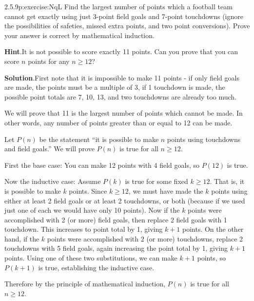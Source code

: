 \documentclass[twoside,11pt,]{book}
\newcommand{\blocktitlefont}{\relax}
\numberwithin{equation}{chapter}
\begin{document}
\begin{divisionsolution}{2.5.9}{}{p:exercise:NqL}%
Find the largest number of points which a football team cannot get exactly using just 3-point field goals and 7-point touchdowns (ignore the possibilities of safeties, missed extra points, and two point conversions). Prove your answer is correct by mathematical induction.%
\par\smallskip%
\noindent\textbf{\blocktitlefont Hint}.\quad{}It is not possible to score exactly 11 points.  Can you prove that you can score \(n\) points for any \(n \ge 12\)?%
\par\smallskip%
\noindent\textbf{\blocktitlefont Solution}.\quad{}First note that it is impossible to make 11 points - if only field goals are made, the points must be a multiple of 3, if 1 touchdown is made, the possible point totals are 7, 10, 13, \textellipsis{} and two touchdowns are already too much.%
\par
We will prove that 11 is the largest number of points which cannot be made. In other words, any number of points greater than or equal to 12 can be made.%
\begin{solutionproof}
Let \(P(n)\) be the statement ``it is possible to make \(n\) points using touchdowns and field goals.'' We will prove \(P(n)\) is true for all \(n \ge 12\).%
\par
First the base case: You can make 12 points with 4 field goals, so \(P(12)\) is true.%
\par
Now the inductive case: Assume \(P(k)\) is true for some fixed \(k \ge 12\). That is, it is possible to make \(k\) points. Since \(k \ge 12\), we must have made the \(k\) points using either at least 2 field goals or at least 2 touchdowns, or both (because if we used just one of each we would have only 10 points). Now if the \(k\) points were accomplished with 2 (or more) field goals, then replace 2 field goals with 1 touchdown. This increases to point total by 1, giving \(k + 1\) points. On the other hand, if the \(k\) points were accomplished with \(2\) (or more) touchdowns, replace 2 touchdowns with 5 field goals, again increasing the point total by 1, giving \(k+1\) points. Using one of these two substitutions, we can make \(k+1\) points, so \(P(k+1)\) is true, establishing the inductive case.%
\par
Therefore by the principle of mathematical induction, \(P(n)\) is true for all \(n \ge 12\).%
\end{solutionproof}
\end{divisionsolution}%
\end{document}
